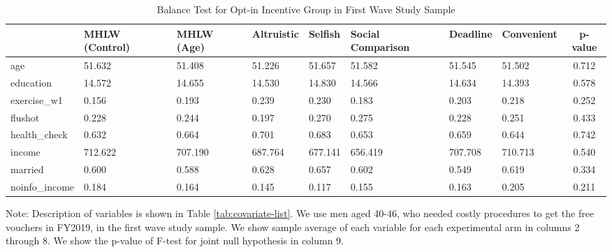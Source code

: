 \begin{table}[!h]

\caption{Balance Test for Opt-in Incentive Group in First Wave Study Sample \label{tab:int-coupon0-balance}}
\centering
\fontsize{9}{11}\selectfont
\begin{threeparttable}
\begin{tabular}[t]{l>{\centering\arraybackslash}p{3em}>{\centering\arraybackslash}p{3em}>{\centering\arraybackslash}p{3em}>{\centering\arraybackslash}p{3em}>{\centering\arraybackslash}p{3em}>{\centering\arraybackslash}p{3em}>{\centering\arraybackslash}p{3em}c}
\toprule
  & MHLW (Control) & MHLW (Age) & Altruistic & Selfish & Social Comparison & Deadline & Convenient & p-value\\
\midrule
age & \num{51.632} & \num{51.408} & \num{51.226} & \num{51.657} & \num{51.582} & \num{51.545} & \num{51.502} & \num{0.712}\\
education & \num{14.572} & \num{14.655} & \num{14.530} & \num{14.830} & \num{14.566} & \num{14.634} & \num{14.393} & \num{0.578}\\
exercise\_w1 & \num{0.156} & \num{0.193} & \num{0.239} & \num{0.230} & \num{0.183} & \num{0.203} & \num{0.218} & \num{0.252}\\
flushot & \num{0.228} & \num{0.244} & \num{0.197} & \num{0.270} & \num{0.275} & \num{0.228} & \num{0.251} & \num{0.433}\\
health\_check & \num{0.632} & \num{0.664} & \num{0.701} & \num{0.683} & \num{0.653} & \num{0.659} & \num{0.644} & \num{0.742}\\
income & \num{712.622} & \num{707.190} & \num{687.764} & \num{677.141} & \num{656.419} & \num{707.708} & \num{710.713} & \num{0.540}\\
married & \num{0.600} & \num{0.588} & \num{0.628} & \num{0.657} & \num{0.602} & \num{0.549} & \num{0.619} & \num{0.334}\\
noinfo\_income & \num{0.184} & \num{0.164} & \num{0.145} & \num{0.117} & \num{0.155} & \num{0.163} & \num{0.205} & \num{0.211}\\
\bottomrule
\end{tabular}
\begin{tablenotes}
\item Note: Description of variables is shown in Table \ref{tab:covariate-list}. We use men aged 40-46, who needed costly procedures to get the free vouchers in FY2019, in the first wave study sample. We show sample average of each variable for each experimental arm in columns 2 through 8. We show the p-value of F-test for joint null hypothesis in column 9.
\end{tablenotes}
\end{threeparttable}
\end{table}
